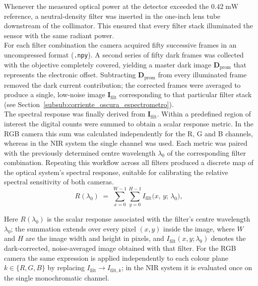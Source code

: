 \noindent
Whenever the measured optical power at the detector exceeded the \(0.42\;\mathrm{mW}\) reference, a neutral-density filter was inserted in the one-inch lens tube downstream of the collimator.  
This ensured that every filter stack illuminated the sensor with the same radiant power.\\

\noindent
For each filter combination the camera acquired fifty successive frames in an uncompressed format (\texttt{.npy}).  
A second series of fifty dark frames was collected with the objective completely covered, yielding a master dark image \(\mathbf{D}_{\text{prom}}\) that represents the electronic offset.  
Subtracting \(\mathbf{D}_{\text{prom}}\) from every illuminated frame removed the dark current contribution; the corrected frames were averaged to produce a single, low-noise image \(\mathbf{I}_{\text{filt}}\) corresponding to that particular filter stack (see Section~\ref{subsub:corriente_oscura_espectrometro}). \\


\noindent
The spectral response was finally derived from \(\mathbf{I}_{\text{filt}}\).  
Within a predefined region of interest the digital counts were summed to obtain a scalar response metric.  
In the RGB camera this sum was calculated independently for the R, G and B channels, whereas in the NIR system the single channel was used.  
Each metric was paired with the previously determined centre wavelength \(\lambda_{0}\) of the corresponding filter combination.  
Repeating this workflow across all filters produced a discrete map of the optical system’s spectral response, suitable for calibrating the relative spectral sensitivity of both cameras.\\

\begin{equation}
    R(\lambda_{0}) \;=\;
    \sum_{x=0}^{W-1}\sum_{y=0}^{H-1}
    I_{\text{filt}}\bigl(x,\,y;\,\lambda_{0}\bigr),
    \label{eq:spectral_response_metric_full}
\end{equation}

\noindent
Here \(R(\lambda_{0})\) is the scalar response associated with the filter’s centre wavelength \(\lambda_{0}\); the summation extends over every pixel \((x,y)\) inside the image, where $W$ and $H$ are the image width and height in pixels, and \(I_{\text{filt}}(x,y;\lambda_{0})\) denotes the dark-corrected, noise-averaged image obtained with that filter. For the RGB camera the same expression is applied independently to each colour plane \(k\in\{R,G,B\}\) by replacing \(I_{\text{filt}}\rightarrow I_{\text{filt},k}\); in the NIR system it is evaluated once on the single monochromatic channel.



